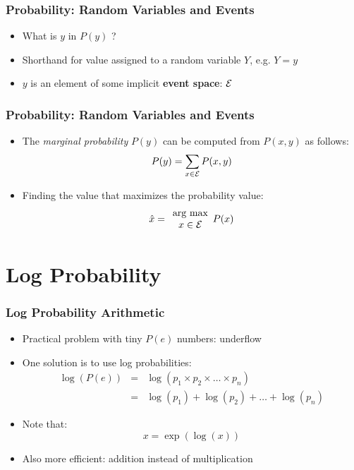 \documentclass[handout]{beamer}
\newcommand{\argmax}[1]{\begin{array}{c}\mbox{arg max}\\#1\end{array}}
\begin{document}
\begin{frame}
\frametitle{Probability: Random Variables and Events}
\begin{itemize}[<+->]
\item What is $y$ in $P(y)$ ?
\item Shorthand for value assigned to a random variable $Y$, e.g. $Y = y$
\item $y$ is an element of some implicit {\bf event space}: ${\cal E}$
\end{itemize}

\end{frame}

\begin{frame}
\frametitle{Probability: Random Variables and Events}
\begin{itemize}[<+->]
\item The {\em marginal probability} $P(y)$ can be computed from $P(x,y)$ as
  follows:
\[ P(y) = \sum_{x \in {\cal E}} P(x,y) \]
\item Finding the value that maximizes the probability value:
\[ \hat{x} = \argmax{x \in {\cal E}} P(x) \]
\end{itemize}

\end{frame}

\section{Log Probability}
\frame{\tableofcontents[currentsection]}

\begin{frame}
\frametitle{Log Probability Arithmetic}
\begin{itemize}[<+->]
\item Practical problem with tiny $P(e)$ numbers: underflow
\item One solution is to use log probabilities:
\begin{eqnarray}
\log(P(e)) &=& \log(p_1 \times p_2 \times \ldots \times p_n) \nonumber
\\
&=& \log(p_1) + \log(p_2) + \ldots + \log(p_n) \nonumber
\end{eqnarray}
\item Note that: \[ x = \exp(\log(x)) \]
\item Also more efficient: addition instead of multiplication
\end{itemize}

\end{frame}
\end{document}
